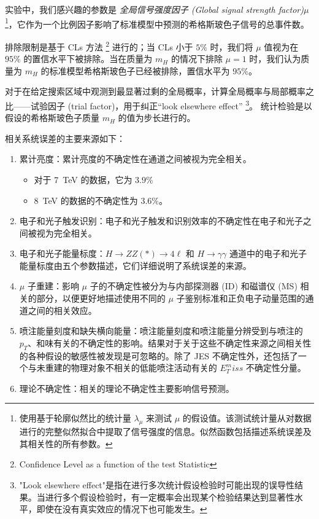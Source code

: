 实验中，我们感兴趣的参数是 \emph{全局信号强度因子 (Global signal strength factor)}$\mu$ \footnote{使用基于轮廓似然比的统计量 $\lambda_\mu$ 来测试 $\mu$ 的假设值。该测试统计量从对数据进行的完整似然拟合中提取了信号强度的信息。似然函数包括描述系统误差及其相关性的所有参数。}，它作为一个比例因子影响了标准模型中预测的希格斯玻色子信号的总事件数。

排除限制是基于 CLs 方法 \footnote{Confidence Level as a function of the test Statistic} 进行的；当 CLs 小于 $5\%$ 时，我们将 $\mu$ 值视为在 $95\%$ 的置信水平下被排除。当在质量为 $m_H$ 的情况下排除 $\mu=1$ 时，我们认为质量为 $m_H$ 的标准模型希格斯玻色子已经被排除，置信水平为 $95\%$。

对于在给定搜索区域中观测到最显著过剩的全局概率，计算全局概率与局部概率之比——试验因子 (trial factor)，用于纠正“look elsewhere effect” \footnote{"Look elsewhere effect"是指在进行多次统计假设检验时可能出现的误导性结果。当进行多个假设检验时，有一定概率会出现某个检验结果达到显著性水平，即使在没有真实效应的情况下也可能发生。}。 统计检验是以假设的希格斯玻色子质量 $m_H$ 的值为步长进行的。

相关系统误差的主要来源如下：

\begin{enumerate}
    \item 累计亮度：累计亮度的不确定性在通道之间被视为完全相关。
        \begin{itemize}
            \item 对于 \qty{7}{TeV} 的数据，它为 $3.9\%$
            \item \qty{8}{TeV} 的数据的不确定性为 $3.6\%$。
        \end{itemize}
    \item 电子和光子触发识别：电子和光子触发和识别效率的不确定性在电子和光子之间被视为完全相关。
    \item 电子和光子能量标度：$H \to ZZ(*) \to 4\ell$ 和 $H\to\gamma\gamma$ 通道中的电子和光子能量标度由五个参数描述，它们详细说明了系统误差的来源。
    \item $\mu$ 子重建：影响 $\mu$ 子的不确定性被分为与内部探测器 (ID) 和磁谱仪 (MS) 相关的部分，以便更好地描述使用不同的 $\mu$ 子鉴别标准和正负电子动量范围的通道之间的相关效应。
    \item 喷注能量刻度和缺失横向能量：喷注能量刻度和喷注能量分辨受到与喷注的 $p_T$、和味有关的不确定性的影响。结果对于关于这些不确定性来源之间相关性的各种假设的敏感性被发现是可忽略的。除了 JES 不确定性外，还包括了一个与未重建的物理对象不相关的低能喷注活动有关的 $E_T^miss$ 不确定性分量。
    \item 理论不确定性：相关的理论不确定性主要影响信号预测。
\end{enumerate}

